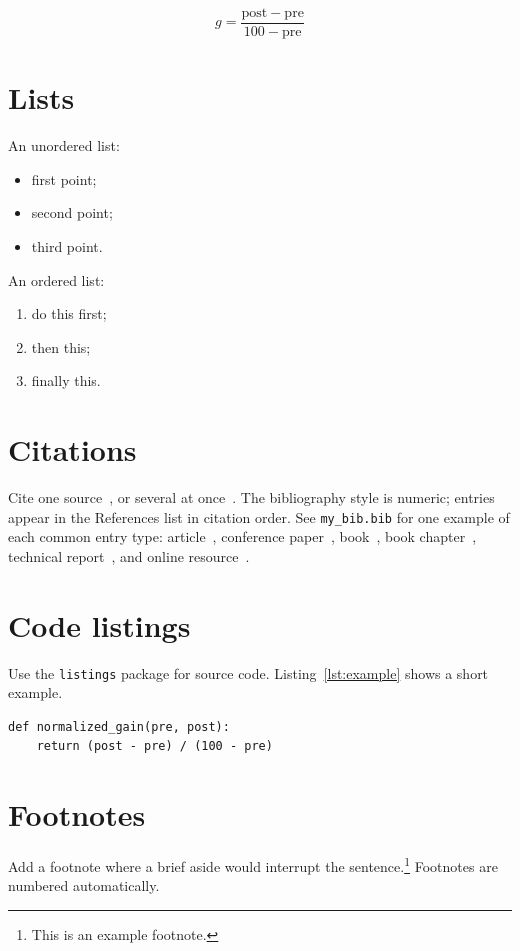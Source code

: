 \begin{equation}
  \label{eq:example}
  g = \frac{\mathrm{post} - \mathrm{pre}}{100 - \mathrm{pre}}
\end{equation}

\section{Lists}
\label{sec:lists}

An unordered list:
\begin{itemize}
  \item first point;
  \item second point;
  \item third point.
\end{itemize}

An ordered list:
\begin{enumerate}
  \item do this first;
  \item then this;
  \item finally this.
\end{enumerate}

\section{Citations}
\label{sec:cite}

Cite one source~\cite{example-article}, or several at once~\cite{example-inproceedings,
example-techreport}. The bibliography style is numeric; entries appear in the
References list in citation order. See \texttt{my\_bib.bib} for one example of each
common entry type: article~\cite{example-article}, conference
paper~\cite{example-inproceedings}, book~\cite{example-book}, book
chapter~\cite{example-incollection}, technical report~\cite{example-techreport},
and online resource~\cite{example-online}.

\section{Code listings}
\label{sec:code}

Use the \texttt{listings} package for source code. Listing~\ref{lst:example} shows
a short example.

\begin{lstlisting}[caption={An example code listing.},label={lst:example},basicstyle=\ttfamily\small,frame=single]
def normalized_gain(pre, post):
    return (post - pre) / (100 - pre)
\end{lstlisting}

\section{Footnotes}
\label{sec:foot}

Add a footnote where a brief aside would interrupt the sentence.\footnote{This is
an example footnote.} Footnotes are numbered automatically.
